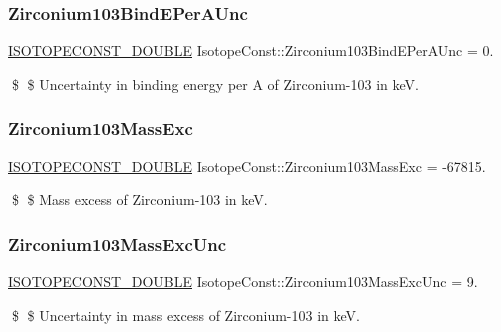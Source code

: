 \subsubsection{\texorpdfstring{Zirconium103\+Bind\+E\+Per\+A\+Unc}{Zirconium103BindEPerAUnc}}
{\footnotesize\ttfamily \mbox{\hyperlink{group___isotope_const-_macros_ga8f45a7272ce02c0b4c65c44636ed719a}{I\+S\+O\+T\+O\+P\+E\+C\+O\+N\+S\+T\+\_\+\+D\+O\+U\+B\+LE}} Isotope\+Const\+::\+Zirconium103\+Bind\+E\+Per\+A\+Unc = 0.}

\$ \$ Uncertainty in binding energy per A of Zirconium-\/103 in keV. \mbox{\label{group___isotope_const-_zirconium-_zr103_ga9ee5e59b17167dad78724f065d7a8c5f}} 
\subsubsection{\texorpdfstring{Zirconium103\+Mass\+Exc}{Zirconium103MassExc}}
{\footnotesize\ttfamily \mbox{\hyperlink{group___isotope_const-_macros_ga8f45a7272ce02c0b4c65c44636ed719a}{I\+S\+O\+T\+O\+P\+E\+C\+O\+N\+S\+T\+\_\+\+D\+O\+U\+B\+LE}} Isotope\+Const\+::\+Zirconium103\+Mass\+Exc = -\/67815.}

\$ \$ Mass excess of Zirconium-\/103 in keV. \mbox{\label{group___isotope_const-_zirconium-_zr103_ga45344967aed26c54bea7a59e530e5540}} 
\subsubsection{\texorpdfstring{Zirconium103\+Mass\+Exc\+Unc}{Zirconium103MassExcUnc}}
{\footnotesize\ttfamily \mbox{\hyperlink{group___isotope_const-_macros_ga8f45a7272ce02c0b4c65c44636ed719a}{I\+S\+O\+T\+O\+P\+E\+C\+O\+N\+S\+T\+\_\+\+D\+O\+U\+B\+LE}} Isotope\+Const\+::\+Zirconium103\+Mass\+Exc\+Unc = 9.}

\$ \$ Uncertainty in mass excess of Zirconium-\/103 in keV. \mbox{\label{group___isotope_const-_zirconium-_zr103_ga2443556d1f026eaa4d359b49840ab637}} 
